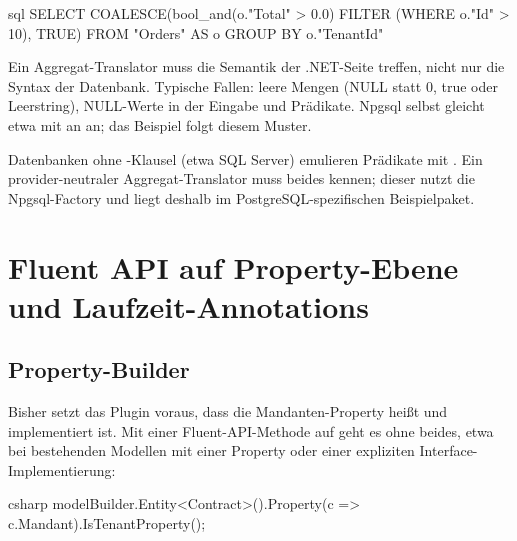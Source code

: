 \begin{sourcecode}[Erzeugtes SQL für g.\allowbreak{}Where(\allowbreak{}o => o.\allowbreak{}Id > 10).\allowbreak{}Select(\allowbreak{}o => o.\allowbreak{}Total > 0)]{sql}
SELECT COALESCE(bool_and(o."Total" > 0.0) FILTER (WHERE o."Id" > 10), TRUE)
FROM "Orders" AS o
GROUP BY o."TenantId"
\end{sourcecode}

\begin{important}
  Ein Aggregat-Translator muss die Semantik der .NET-Seite treffen, nicht nur die Syntax der
  Datenbank. Typische Fallen: leere Mengen (NULL statt 0, true oder Leerstring), NULL-Werte
  in der Eingabe und Prädikate. Npgsql selbst gleicht etwa 
  mit  an  an; das Beispiel folgt diesem
  Muster.
\end{important}

Datenbanken ohne -Klausel (etwa SQL Server) emulieren Prädikate mit . Ein provider-neutraler Aggregat-Translator muss beides kennen;
dieser nutzt die Npgsql-Factory und liegt deshalb im PostgreSQL-spezifischen Beispielpaket.

\chapter{Fluent API auf Property-Ebene und Laufzeit-Annotations}\label{ch:property-level-fluent-api-and}

\section{Property-Builder}

Bisher setzt das Plugin voraus, dass die Mandanten-Property 
heißt und  implementiert ist. Mit einer Fluent-API-Methode
auf  geht es ohne beides, etwa bei bestehenden Modellen
mit einer Property  oder einer expliziten
Interface-Implementierung:

\begin{sourcecode}[Anwendung]{csharp}
modelBuilder.Entity<Contract>().Property(c => c.Mandant).IsTenantProperty();
\end{sourcecode}

